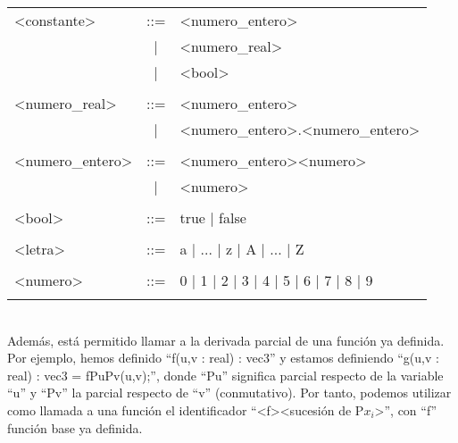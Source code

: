 \begin{tabular}{| p{3.5cm} c p{10cm} |}
\hline
<constante>               &::=&  <numero\_entero> \\
                           &|&  <numero\_real> \\
                           &|&  <bool> \\
&&\\

<numero\_real>             &::=&  <numero\_entero> \\
                           &|&  <numero\_entero>.<numero\_entero> \\
&&\\

<numero\_entero>           &::=&  <numero\_entero><numero> \\
                           &|&  <numero> \\
&&\\

<bool>                    &::=&  true | false \\
&&\\

<letra>                   &::=&  a | ... | z | A | ... | Z \\
&&\\

<numero>                  &::=&  0 | 1 | 2 | 3 | 4 | 5 | 6 | 7 | 8 | 9 \\
&&\\
\hline
\end{tabular}
\vspace{0.5cm}
\\Además, está permitido llamar a la derivada parcial de una función ya definida. Por ejemplo, hemos definido ``f(u,v : real) : vec3'' y estamos definiendo ``g(u,v : real) : vec3 = fPuPv(u,v);'', donde ``Pu'' significa parcial respecto de la variable ``u'' y ``Pv'' la parcial respecto de ``v'' (conmutativo). Por tanto, podemos utilizar como llamada a una función el identificador ``<f><sucesión de P$x_i$>'', con ``f'' función base ya definida.

\endinput
